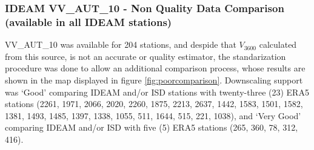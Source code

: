 \documentclass[12pt,oneside]{reedthesis}
\begin{document}
\hypertarget{ideam-vv_aut_10---non-quality-data-comparison-available-in-all-ideam-stations}{%
\subsubsection{IDEAM VV\_AUT\_10 - Non Quality Data Comparison (available in all IDEAM stations)}\label{ideam-vv_aut_10---non-quality-data-comparison-available-in-all-ideam-stations}}

VV\_AUT\_10 was available for 204 stations, and despide that \(V_{3600}\) calculated from this source, is not an accurate or quality estimator, the standarization procedure was done to allow an additional comparison process, whose results are shown in the map displayed in figure \ref{fig:poorcomparison}. Downscaling support was `Good' comparing IDEAM and/or ISD stations with twenty-three (23) ERA5 stations (2261, 1971, 2066, 2020, 2260, 1875, 2213, 2637, 1442, 1583, 1501, 1582, 1381, 1493, 1485, 1397, 1338, 1055, 511, 1644, 515, 221, 1038), and `Very Good' comparing IDEAM and/or ISD with five (5) ERA5 stations (265, 360, 78, 312, 416).
\end{document}
